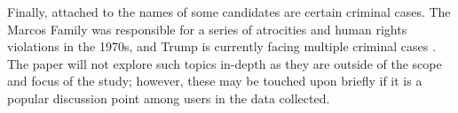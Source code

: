 Finally, attached to the names of some candidates are certain criminal cases. The Marcos Family was responsible for a series of atrocities and human rights violations in the 1970s, and Trump is currently facing multiple criminal cases \cite{SaL_AlJazeera-2024,SaL_AmnInt-2022}. The paper will not explore such topics in-depth as they are outside of the scope and focus of the study; however, these may be touched upon briefly if it is a popular discussion point among users in the data collected.